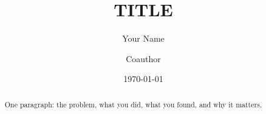\documentclass[11pt]{article}
\title{{{TITLE}}}
\author{Your Name \and Coauthor}
\date{\today}
\begin{document}
\maketitle

\begin{abstract}
One paragraph: the problem, what you did, what you found, and why it matters.
\end{abstract}






\end{document}
